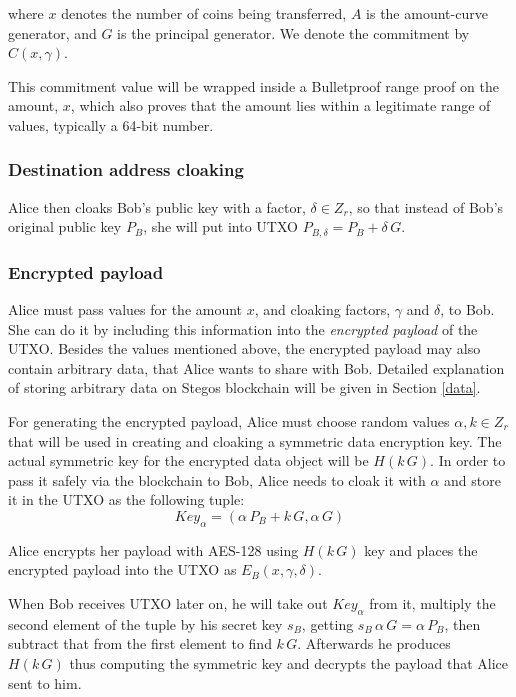 \documentclass[a4paper, 10pt, conference]{ieeeconf}
\begin{document}
where $x$ denotes the number of coins being transferred, $A$ is the amount-curve generator, and $G$ is the principal generator. We denote the commitment by $C(x, \gamma)$. 

This commitment value will be wrapped inside a Bulletproof range proof on the amount, $x$, which also proves that the amount lies within a legitimate range of values, typically a 64-bit number.

\subsubsection{Destination address cloaking} Alice then cloaks Bob's public key with a factor, $\delta \in Z_r$, so that instead of Bob's original public key $P_B$, she will put into UTXO $P_{B, \delta} = P_B + \delta \, G$.


\subsubsection{Encrypted payload} Alice must pass values for the amount $x$, and cloaking factors, $\gamma$ and $\delta$, to Bob. She can do it by including this information into the \textit{encrypted payload} of the UTXO. Besides the values mentioned above, the encrypted payload may also contain arbitrary data, that Alice wants to share with Bob. Detailed explanation of storing arbitrary data on Stegos blockchain will be given in Section \ref{data}. 

For generating the encrypted payload, Alice must choose random values $\alpha, k \in Z_r$ that will be used in creating and cloaking a symmetric data encryption key.
The actual symmetric key for the encrypted data object will be $H(k \, G)$. In order to pass it safely via the blockchain to Bob, Alice needs to cloak it with $\alpha$ and store it in the UTXO as the following tuple: $$\mathit{Key}_{\alpha} = (\alpha \, P_{B} + k \, G, \alpha \, G )$$ 

Alice encrypts her payload with AES-128 using $H(k \, G)$ key and places the encrypted payload into the UTXO as $E_B(x, \gamma, \delta)$.

When Bob receives UTXO later on, he will take out $\mathit{Key}_{\alpha}$ from it, multiply the second element of the tuple by his secret key $s_B$, getting $s_B \, \alpha \, G = \alpha \, P_B$, then subtract that from the first element to find $k \, G$. Afterwards he produces $H(k \, G)$ thus computing the symmetric key and decrypts the payload that Alice sent to him.
\end{document}
